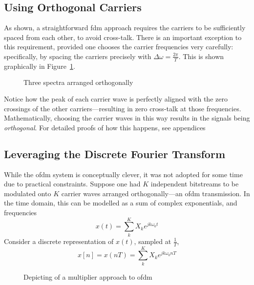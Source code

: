 \documentclass[class=report,11pt,crop=false]{standalone}
\begin{document}
\subsection{Using Orthogonal Carriers}
As shown, a straightforward \gls{fdm} approach requires the carriers to be sufficiently spaced from each other, to avoid cross-talk. There is an important exception to this requirement, provided one chooses the carrier frequencies very carefully: specifically, by spacing the carriers precisely with \(\Delta \omega = \frac{2\pi}{T}\). This is shown graphically in Figure~\ref{fig:ofdm-three-sincs}.

\begin{figure}[htbp]
    \centering
    \captionsetup{type=figure}
    \def\svgwidth{1\linewidth}
    { %
        }
    \caption{Three spectra arranged orthogonally}
    \label{fig:ofdm-three-sincs}
\end{figure}

Notice how the peak of each carrier wave is perfectly aligned with the zero crossings of the other carriers---resulting in zero cross-talk at those frequencies. Mathematically, choosing the carrier waves in this way results in the signals being \emph{orthogonal}. For detailed proofs of how this happens, see appendices%

\subsection{Leveraging the Discrete Fourier Transform}
While the \gls{ofdm} system is conceptually clever, it was not adopted for some time due to practical constraints. Suppose one had \(K\) independent bitstreams to be modulated onto \(K\) carrier waves arranged orthogonally---an \gls{ofdm} transmission. In the time domain, this can be modelled as a sum of complex exponentials, and frequencies 
\begin{equation}    
    x(t) = \sum^K_{k} X_k e^{j k \omega_0 t}
\end{equation}
Consider a discrete representation of \(x(t)\), sampled at \(\frac{1}{T}\),
\begin{equation}
    x[n] = x(nT) = \sum^K_{k} X_k e^{j k \omega_0 nT}
\end{equation}


\begin{figure}
    \centering
    \captionsetup{type=figure}
    \def\svgwidth{\linewidth}
    {
        \scriptsize
        
    }
    \caption{Depicting of a multiplier approach to \gls{ofdm}}
    \label{fig:ofdm-multipliers}
\end{figure}
\end{document}
